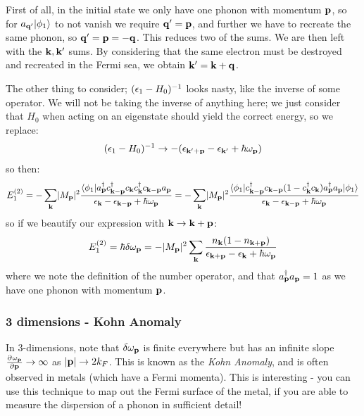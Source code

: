 First of all, in the initial state we only have one phonon with momentum $\mathbf{p}$, so for $a_{\mathbf{q}'}\lvert \phi_1 \rangle$ to not vanish we require $\mathbf{q}' = \mathbf{p}$, and further we have to recreate the same phonon, so $\mathbf{q}' = \mathbf{p} = -\mathbf{q}$. This reduces two of the sums. We are then left with the $\mathbf{k}, \mathbf{k}'$ sums. By considering that the same electron must be destroyed and recreated in the Fermi sea, we obtain $\mathbf{k}' = \mathbf{k} + \mathbf{q}$. 

The other thing to consider; $(\epsilon_1 - H_0)^{-1}$ looks nasty, like the inverse of some operator. We will not be taking the inverse of anything here; we just consider that $H_0$ when acting on an eigenstate should yield the correct energy, so we replace:
\begin{equation}
    (\epsilon_1 - H_0)^{-1} \to -(\epsilon_{\mathbf{k}' + \mathbf{p}} - \epsilon_{\mathbf{k}'} + \hbar \omega_{\mathbf{p}})
\end{equation}
so then:
\begin{equation}
    E_1^{(2)} = -\sum_{\mathbf{k}}\lvert M_{\mathbf{p}} \rvert^2 \frac{\langle \phi_1 \rvert a^\dagger_{\mathbf{p}} c^\dagger_{\mathbf{k} - \mathbf{p}}c_{\mathbf{k}}c^\dagger_{\mathbf{k}} c_{\mathbf{k} - \mathbf{p}}a_{\mathbf{p}}}{\epsilon_{\mathbf{k}} - \epsilon_{\mathbf{k} - \mathbf{p}} + \hbar \omega_{\mathbf{p}}} = -\sum_{\mathbf{k}}\lvert M_{\mathbf{p}} \rvert^2 \frac{\langle \phi_1 \rvert c^\dagger_{\mathbf{k} - \mathbf{p}}c_{\mathbf{k} - \mathbf{p}}(1 - c^\dagger_{\mathbf{k}}c_{\mathbf{k}})a^\dagger_{\mathbf{p}}a_{\mathbf{p}} \lvert \phi_1 \rangle}{\epsilon_{\mathbf{k}} - \epsilon_{\mathbf{k} - \mathbf{p}} + \hbar \omega_{\mathbf{p}}}
\end{equation}
so if we beautify our expression with $\mathbf{k} \to \mathbf{k} + \mathbf{p}$:
\begin{equation}
    E_1^{(2)} = \hbar \delta \omega_{\mathbf{p}} = -\lvert M_{\mathbf{p}} \rvert^2 \sum_{\mathbf{k}}\frac{n_{\mathbf{k}}(1 - n_{\mathbf{k} + \mathbf{p}})}{\epsilon_{\mathbf{k} + \mathbf{p}} - \epsilon_{\mathbf{k}} + \hbar\omega_{\mathbf{p}}}
\end{equation}
where we note the definition of the number operator, and that $a^\dagger_{\mathbf{p}}a_{\mathbf{p}} = 1$ as we have one phonon with momentum $\mathbf{p}$. 

\subsubsection{3 dimensions - Kohn Anomaly}
In 3-dimensions, note that $\delta \omega_{\mathbf{p}}$ is finite everywhere but has an infinite slope $\pd{\omega_\v{p}}{\v{p}} \to \infty$ as $\lvert \mathbf{p} \rvert \to 2k_F$. This is known as the \emph{Kohn Anomaly}, and is often observed in metals (which have a Fermi momenta). This is interesting - you can use this technique to map out the Fermi surface of the metal, if you are able to measure the dispersion of a phonon in sufficient detail!

